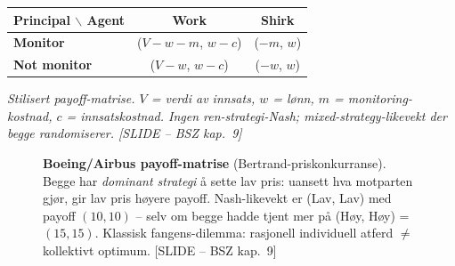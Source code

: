 \begin{center}
\renewcommand{\arraystretch}{1.25}
\begin{tabular}{@{}l|c|c|@{}}
\textbf{Principal $\backslash$ Agent} & \textbf{Work} & \textbf{Shirk} \\
\hline
\textbf{Monitor} & ($V-w-m$,\; $w-c$) & ($-m$,\; $w$) \\
\hline
\textbf{Not monitor} & ($V-w$,\; $w-c$) & ($-w$,\; $w$) \\
\hline
\end{tabular}
\end{center}
\textit{Stilisert payoff-matrise. $V$ = verdi av innsats, $w$ = lønn, $m$ = monitoring-kostnad, $c$ = innsats\-kostnad. Ingen ren-strategi-Nash; mixed-strategy-likevekt der begge randomiserer. [SLIDE -- BSZ kap.\ 9]}

\begin{figure}[H]
\centering
{}
\caption{\textbf{Boeing/Airbus payoff-matrise} (Bertrand-priskonkurranse). Begge har \emph{dominant strategi} å sette lav pris: uansett hva motparten gjør, gir lav pris høyere payoff. Nash-likevekt er (Lav, Lav) med payoff $(10, 10)$ -- selv om begge hadde tjent mer på (Høy, Høy) = $(15, 15)$. Klassisk fangens-dilemma: rasjonell individuell atferd $\neq$ kollektivt optimum. [SLIDE -- BSZ kap.\ 9]}
\end{figure}

